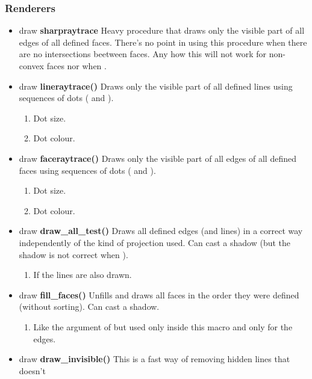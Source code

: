 \subsubsection{Renderers}

\begin{itemize}
\item draw {\bfseries sharpraytrace} Heavy procedure that
draws only the visible part of all edges of all defined
faces. There's no point in using this procedure when
there are no intersections beetween faces. Any how
this will not work for non-convex faces nor when
.
\item draw {\bfseries lineraytrace()} Draws only the
visible part of all defined lines using sequences of dots
( and ).
\begin{enumerate}
\item {} Dot size.
\item {} Dot colour.
\end{enumerate}
\item draw {\bfseries faceraytrace()} Draws only the
visible part of all edges of all defined faces
using sequences of dots
( and ).
\begin{enumerate}
\item {} Dot size.
\item {} Dot colour.
\end{enumerate}
\item draw {\bfseries draw\_all\_test()} Draws all defined
edges (and lines) in a correct way independently of
the kind of projection used. Can cast a shadow (but
the shadow is not correct when
).
\begin{enumerate}
\item {} If  the lines
are also drawn.
\end{enumerate}
\item draw {\bfseries fill\_faces()} Unfills and draws all
faces in the order they were defined (without
sorting). Can cast a shadow.
\begin{enumerate}
\item {} Like the argument of
 but used only inside this
macro and only for the edges.
\end{enumerate}
\item draw {\bfseries draw\_invisible()} This is a fast way
of removing hidden lines that doesn't

\end{itemize}
